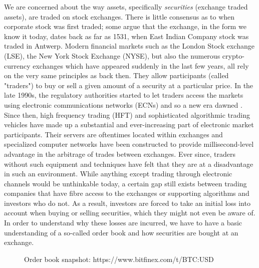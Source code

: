We are concerned about the way assets, specifically \textit{securities} (exchange traded assets), are traded on stock exchanges.
There is little consensus as to when corporate stock was first traded; some argue that the exchange, in the form we know it today, dates back as far as 1531, when East Indian Company stock was traded in Antwerp\cite{stock-exchange}.
Modern financial markets such as the London Stock exchange (LSE), the New York Stock Exchange (NYSE), but also the numerous crypto-currency exchanges which have appeared suddenly in the last few years, all rely on the very same principles as back then.
They allow participants (called "traders") to buy or sell a given amount of a security at a particular price.
In the late 1990s, the regulatory authorities started to let traders access the markets using electronic communications networks (ECNs) and so a new era dawned \cite{patterson2012dark}.
Since then, high frequency trading (HFT) and sophisticated algorithmic trading vehicles have made up a substantial and ever-increasing part of electronic market participants.
Their servers are oftentimes located within exchanges and specialized computer networks have been constructed to provide millisecond-level advantage in the arbitrage of trades between exchanges.
Ever since, traders without such equipment and techniques have felt that they are at a disadvantage in such an environment. \cite{patterson2012dark}
While anything except trading through electronic channels would be unthinkable today, a certain gap still exists between trading companies that have fibre access to the exchanges or supporting algorithms and investors who do not.
As a result, investors are forced to take an initial loss into account when buying or selling securities, which they might not even be aware of.
In order to understand why these losses are incurred, we have to have a basic understanding of a so-called order book and how securities are bought at an exchange.

\begin{figure}[H]
    \centering
    \caption{Order book snapshot: https://www.bitfinex.com/t/BTC:USD}
    \label{fig:intro-orderbook}
\end{figure}

